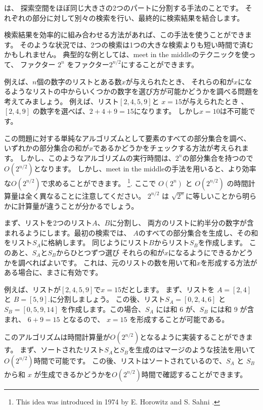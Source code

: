 
は、
探索空間をほぼ同じ大きさの2つのパートに分割する手法のことです。
それぞれの部分に対して別々の検索を行い、最終的に検索結果を結合します。

検索結果を効率的に組み合わせる方法があれば、この手法を使うことができます。
そのような状況では、2つの検索は1つの大きな検索よりも短い時間で済むかもしれません。
典型的な例としては、meet in the middleのテクニックを使って、
ファクター $2^n$ をファクター$2^{n/2}$にすることができます。

例えば、$n$個の数字のリストとある数$x$が与えられたとき、
それらの和が$x$になるようなリストの中からいくつかの数字を選び方が可能かどうかを調べる問題を考えてみましょう。
例えば、リスト$[2,4,5,9]$と $x = 15$が与えられたとき 、
$[2,4,9]$ の数字を選べば、$2+4+9=15$になります。
しかし$x=10$は不可能です。

この問題に対する単純なアルゴリズムとして要素のすべての部分集合を調べ、
いずれかの部分集合の和が$x$であるかどうかをチェックする方法が考えられます。
しかし、このようなアルゴリズムの実行時間は、$2^n$の部分集合を持つので$O(2^{n/2})$となります。
しかし、meet in the middleの手法を用いると、より効率な$O(2^{n/2})$で求めることができます。
\footnote{This
idea was introduced in 1974 by E. Horowitz and S. Sahni \cite{hor74}.}.
ここで $O(2^n)$ と $O(2^{n/2})$ の時間計算量は全く異なることに注意してください。
$2^{n/2}$ は $\sqrt{2^n}$に等しいことから明らかに計算量が違うことが分かるでしょう。

まず、リストを2つのリスト$A$、$B$に分割し、
両方のリストに約半分の数字が含まれるようにします。最初の検索では、
$A$のすべての部分集合を生成し、その和をリスト$S_A$に格納します。
同じようにリスト$B$からリスト$S_B$を作成します。
このあと、$S_A$と$S_B$からひとつずつ選び
それらの和が$x$になるようにできるかどうかを調べればよいです。
これは、元のリストの数を用いて和$x$を形成する方法がある場合に、まさに有効です。

例えば、リストが$[2,4,5,9]$で$x=15$だとします。
まず、リストを $A=[2,4]$ と $B=[5,9]$.に分割しましょう。
この後、リスト$S_A=[0,2,4,6]$ と $S_B=[0,5,9,14]$
を作成します。この場合、$S_A$ には和 $6$ が、$S_B$ には和 9 が含まれ、
$6 + 9 = 15$ となるので、
$x = 15$ を形成することが可能である。

このアルゴリズムは時間計算量が$O(2^{n/2})$となるように実装することができます。
まず、ソートされたリスト$S_A$と$S_B$を生成のはマージのような技法を用いて$O(2^{n/2})$時間で可能です。
この後、リストはソートされているので、$S_A$ と $S_B$ から和 $x$ が生成できるかどうかを$O(2^{n/2})$時間で確認することができます。